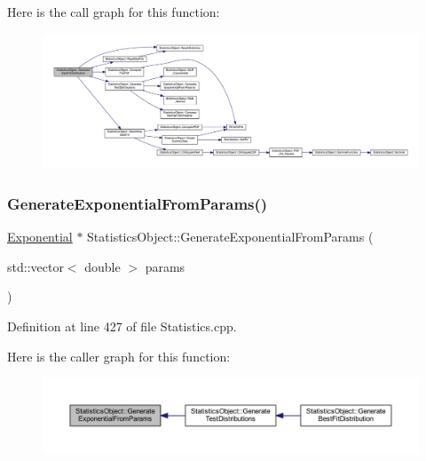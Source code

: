 Here is the call graph for this function\+:\nopagebreak
\begin{figure}[H]
\begin{center}
\leavevmode
\includegraphics[width=350pt]{class_statistics_object_a88d8c8b8fd57da4a08cf1d02d363abf1_cgraph}
\end{center}
\end{figure}
\mbox{\label{class_statistics_object_a850dc5ba25d9017f5a586ba2ffd64d94}} 
\subsubsection{\texorpdfstring{Generate\+Exponential\+From\+Params()}{GenerateExponentialFromParams()}}
{\footnotesize\ttfamily \hyperlink{class_exponential}{Exponential} $\ast$ Statistics\+Object\+::\+Generate\+Exponential\+From\+Params (\begin{DoxyParamCaption}\item[{std\+::vector$<$ double $>$}]{params }\end{DoxyParamCaption})}



Definition at line 427 of file Statistics.\+cpp.

Here is the caller graph for this function\+:\nopagebreak
\begin{figure}[H]
\begin{center}
\leavevmode
\includegraphics[width=350pt]{class_statistics_object_a850dc5ba25d9017f5a586ba2ffd64d94_icgraph}
\end{center}
\end{figure}
\mbox{\label{class_statistics_object_a59cffa517dbb293e1f8fe72f2e6dd34f}} 
